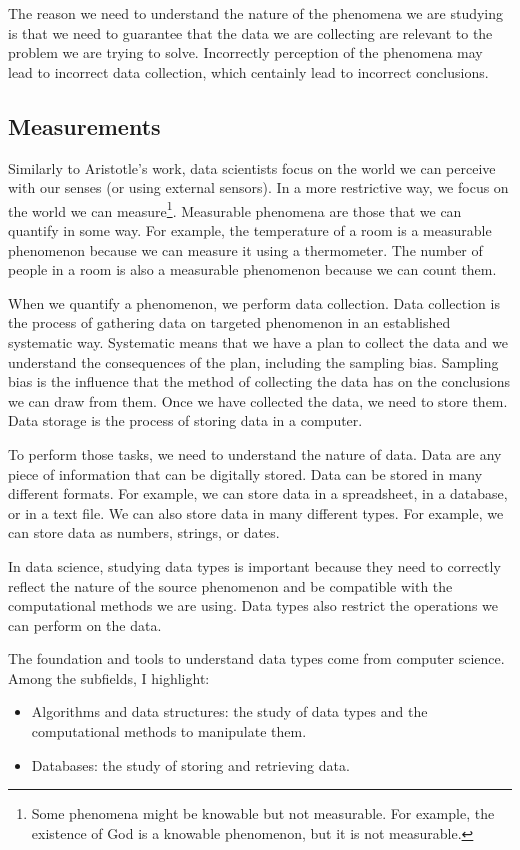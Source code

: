 The reason we need to understand the nature of the phenomena we are studying is that we
need to guarantee that the data we are collecting are relevant to the problem we are
trying to solve.  Incorrectly perception of the phenomena may lead to incorrect data
collection, which centainly lead to incorrect conclusions.

\subsection{Measurements}

Similarly to Aristotle's work, data scientists focus on the world we can perceive with our
senses (or using external sensors).  In a more restrictive way, we focus on the world we
can measure\footnote{Some phenomena might be knowable but not measurable.  For example,
the existence of God is a knowable phenomenon, but it is not measurable.}. Measurable
phenomena are
those that we can quantify in some way.  For example, the temperature of a room is a
measurable phenomenon because we can measure it using a thermometer.  The number of
people in a room is also a measurable phenomenon because we can count them.

When we quantify a phenomenon, we perform data collection.  Data collection is the process
of gathering data on targeted phenomenon in an established systematic way.
Systematic means that we have a plan to collect the data and we understand the
consequences of the plan, including the sampling bias.  Sampling bias is the influence
that the method of collecting the data has on the conclusions we can draw from them.
Once we have collected the data, we need to store them.  Data storage is the process of
storing data in a computer.

To perform those tasks, we need to understand the nature of data.  Data are any piece of
information that can be digitally stored.  Data can be stored in many different formats.
For example, we can store data in a spreadsheet, in a database, or in a text file.  We can
also store data in many different types.  For example, we can store data as numbers,
strings, or dates.

In data science, studying data types is important because they need to correctly reflect
the nature of the source phenomenon and be compatible with the computational methods we
are using.  Data types also restrict the operations we can perform on the data.

The foundation and tools to understand data types come from computer science.  Among the
subfields, I highlight:
\begin{itemize}
  \itemsep0em
  \item Algorithms and data structures: the study of data types and the computational
    methods to manipulate them.
  \item Databases: the study of storing and retrieving data.
\end{itemize}

